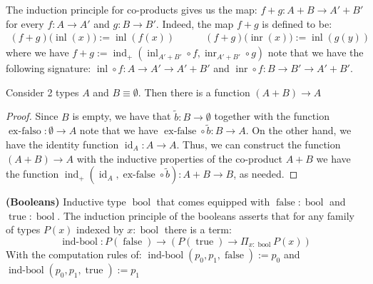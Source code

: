 \begin{remark}
    The induction principle for co-products gives us the map: $f+g : A+B\rightarrow A'+B'$ for every $f:A\rightarrow A'$ and $g:B\rightarrow B'$. Indeed, the map $f+g$ is defined to be:
    \begin{equation*}
    \begin{aligned}
        (f+g)\big(\operatorname{inl}(x)\big) := \operatorname{inl}(f(x)) \qquad \quad (f+g)\big(\operatorname{inr}(x)\big) := \operatorname{inl}(g(y))
    \end{aligned}
    \end{equation*}
    where we have $f+g:=\operatorname{ind}_+(\operatorname{inl}_{A'+B'}\circ f, \operatorname{inr}_{A'+B'}\circ g)$ note that we have the following signature: $\operatorname{inl}\circ f:A\to A'\to A'+B'$ and $\operatorname{inr}\circ f:B\to B'\to A'+B'$.
\end{remark}

\begin{proposition}
    Consider 2 types $A$ and $B\equiv\emptyset$. Then there is a function $(A+B)\rightarrow A$
\end{proposition}
\begin{proof}
    Since $B$ is empty, we have that $\tilde{b}:B\to\emptyset$ together with the function $\operatorname{ex-falso}:\emptyset\to A$ note that we have $\operatorname{ex-false}\circ\tilde{b}:B\to A$. On the other hand, we have the identity function $\operatorname{id}_A:A\to A$. Thus, we can construct the function $(A+B)\to A$ with the inductive properties of the co-product $A+B$ we have the function $\operatorname{ind}_+(\operatorname{id}_A,\operatorname{ex-false}\circ\tilde{b}):A+B\to B$, as needed.
\end{proof}

\begin{definition}{\textbf{(Booleans)}}
    Inductive type $\operatorname{bool}$ that comes equipped with $\operatorname{false}:\operatorname{bool}$ and $\operatorname{true}:\operatorname{bool}$. The induction principle of the booleans asserts that for any family of types $P(x)$ indexed by $x:\operatorname{bool}$ there is a term:
    \begin{equation*}
        \operatorname{ind-bool}: P(\operatorname{false}) \to \left( P(\operatorname{true})\to\Pi_{x:\operatorname{bool}}P(x) \right)
    \end{equation*}
    With the computation rules of: $\operatorname{ind-bool}(p_0,p_1,\operatorname{false}):=p_0$ and $\operatorname{ind-bool}(p_0,p_1,\operatorname{true}):=p_1$
\end{definition}

